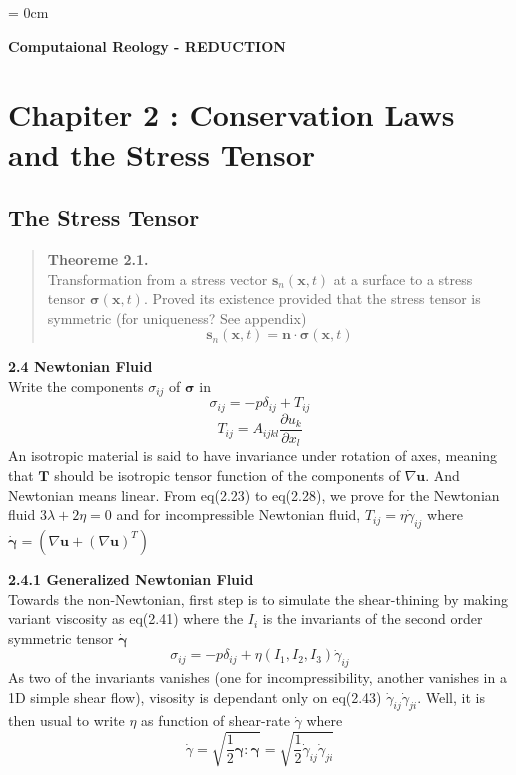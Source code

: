 \documentclass[a4paper,10pt]{article}
\begin{document}
\parindent = 0cm
\parskip=3mm

\LARGE{ {\bf Computaional Reology - REDUCTION}}

\vspace{-.7cm}
\section{Chapiter 2 : Conservation Laws and the Stress Tensor}
\vspace{-.4cm}

\normalsize{}
\subsection{The Stress Tensor}
\vspace{-.2cm}
\normalsize{}
 
\begin{quote}
{\bf Theoreme 2.1.} \\
Transformation from a stress vector $\bm{s}_n(\bm{x},t)$ at a surface to a stress tensor $\bm{\sigma}(\bm{x},t)$. Proved its existence provided that the stress tensor is symmetric (for uniqueness? See appendix)
$$
\bm{s}_n(\bm{x},t) = \bm{n} \cdot \bm{\sigma}(\bm{x},t)
$$
\end{quote}

{\bf 2.4 Newtonian Fluid} \\
Write the components $\sigma_{ij}$ of $\bm{\sigma}$ in 
$$
\sigma_{ij} = -p\delta_{ij}+T_{ij}
$$
$$
T_{ij} = A_{ijkl} \frac{\partial u_k}{\partial x_l}
$$
An isotropic material is said to have invariance under rotation of axes, meaning that $\bm{T}$ should be isotropic tensor function of the components of $\nabla \bm{u}$. And Newtonian means linear. From eq(2.23) to eq(2.28), we prove for the Newtonian fluid $3\lambda + 2\eta = 0$ and for incompressible Newtonian fluid, $T_{ij}=\eta \dot{\gamma}_{ij}$ where $\bm{\dot{\gamma}}=(\nabla \bm{u} + (\nabla \bm{u})^T)$

{\bf 2.4.1 Generalized Newtonian Fluid} \\
Towards the non-Newtonian, first step is to simulate the shear-thining by making variant viscosity as eq(2.41) where the $I_i$ is the invariants of the second order symmetric tensor $\bm{\dot{\gamma}}$ 
$$
\sigma_{ij} = -p \delta_{ij} + \eta (I_1, I_2, I_3) \dot{\gamma}_{ij}
$$
As two of the invariants vanishes (one for incompressibility, another vanishes in a 1D simple shear flow), visosity is dependant only on eq(2.43) $\dot{\gamma}_{ij} \dot{\gamma}_{ji}$. Well, it is then usual to write $\eta$ as function of shear-rate $\dot{\gamma}$  where
$$
\dot{\gamma} = \sqrt{\frac{1}{2} \bm{\gamma}:\bm{\gamma}} = \sqrt{\frac{1}{2} \dot{\gamma}_{ij} \dot{\gamma}_{ji}}
$$ 
\end{document}
